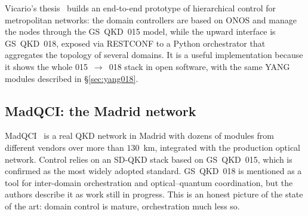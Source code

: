 Vicario's thesis~\cite{vicario2025} builds an end-to-end prototype of
hierarchical control for metropolitan networks: the domain controllers are
based on ONOS and manage the nodes through the GS~QKD~015 model, while the
upward interface is GS~QKD~018, exposed via RESTCONF to a Python
orchestrator that aggregates the topology of several domains. It is a
useful implementation because it shows the whole 015~$\to$~018 stack in
open software, with the same YANG modules described in §\ref{sec:yang018}.

\subsection{MadQCI: the Madrid network}

MadQCI~\cite{madqci2024} is a real QKD network in Madrid with dozens of
modules from different vendors over more than $130$~km, integrated with the
production optical network. Control relies on an SD-QKD stack based on
GS~QKD~015, which is confirmed as the most widely adopted standard.
GS~QKD~018 is mentioned as a tool for inter-domain orchestration and
optical–quantum coordination, but the authors describe it as work still in
progress. This is an honest picture of the state of the art: domain control
is mature, orchestration much less so.

